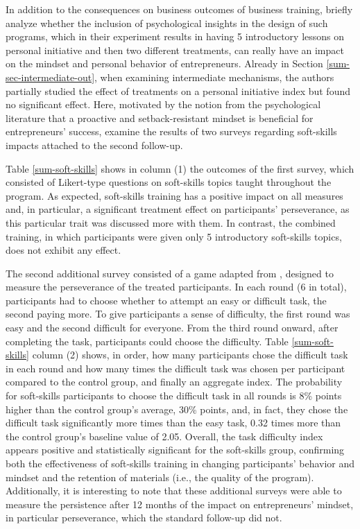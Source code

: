 In addition to the consequences on business outcomes of business training, \cite{Ubfal2022} briefly analyze whether the inclusion of psychological insights in the design of such programs, which in their experiment results in having 5 introductory lessons on personal initiative and then two different treatments, can really have an impact on the mindset and personal behavior of entrepreneurs. Already in Section \ref{sum-sec-intermediate-out}, when examining intermediate mechanisms, the authors partially studied the effect of treatments on a personal initiative index but found no significant effect. Here, motivated by the notion from the psychological literature that a proactive and setback-resistant mindset is beneficial for entrepreneurs' success, \cite{Ubfal2022} examine the results of two surveys regarding soft-skills impacts attached to the second follow-up.

Table \ref{sum-soft-skills} shows in column (1) the outcomes of the first survey, which consisted of Likert-type questions on soft-skills topics taught throughout the program. As expected, soft-skills training has a positive impact on all measures and, in particular, a significant treatment effect on participants' perseverance, as this particular trait was discussed more with them. In contrast, the combined training, in which participants were given only 5 introductory soft-skills topics, does not exhibit any effect.

The second additional survey consisted of a game adapted from \cite{Alan2019}, designed to measure the perseverance of the treated participants. In each round (6 in total), participants had to choose whether to attempt an easy or difficult task, the second paying more. To give participants a sense of difficulty, the first round was easy and the second difficult for everyone. From the third round onward, after completing the task, participants could choose the difficulty. Table \ref{sum-soft-skills} column (2) shows, in order, how many participants chose the difficult task in each round and how many times the difficult task was chosen per participant compared to the control group, and finally an aggregate index. The probability for soft-skills participants to choose the difficult task in all rounds is 8\% points higher than the control group's average, 30\% points, and, in fact, they chose the difficult task significantly more times than the easy task, 0.32 times more than the control group's baseline value of 2.05. Overall, the task difficulty index appears positive and statistically significant for the soft-skills group, confirming both the effectiveness of soft-skills training in changing participants' behavior and mindset and the retention of materials (i.e., the quality of the program). Additionally, it is interesting to note that these additional surveys were able to measure the persistence after 12 months of the impact on entrepreneurs' mindset, in particular perseverance, which the standard follow-up did not.

